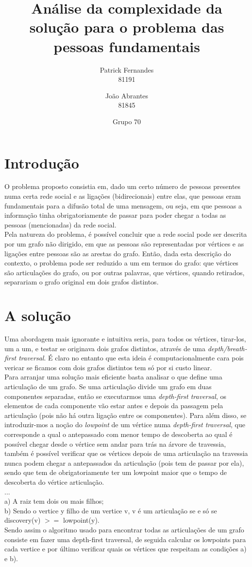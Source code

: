 \documentclass[12pt]{article}
\title{Análise da complexidade da solução para o problema das pessoas fundamentais}
\author{Patrick Fernandes\\81191 \and João Abrantes\\81845}
\date{Grupo 70}
\begin{document}
\maketitle
\section{Introdução}
O problema proposto consistia em, dado um certo número de pessoas presentes numa certa rede social e as ligações (bidirecionais) entre elas, que pessoas eram fundamentais para a difusão total de uma mensagem, ou seja, em que pessoas a informação tinha obrigatoriamente de passar para poder chegar a todas as pessoas (mencionadas) da rede social.\\
Pela natureza do problema, é possível concluir que a rede social pode ser descrita por um grafo não dirigido, em que as pessoas são representadas por vértices e as ligações entre pessoas são as arestas do grafo. Então, dada esta descrição do contexto, o problema pode ser reduzido a um em termos do grafo: que vértices são articulações do grafo, ou por outras palavras, que vértices, quando retirados, separariam o grafo original em dois grafos distintos.
\section{A solução}
Uma abordagem mais ignorante e intuitiva seria, para todos os vértices, tirar-los, um a um, e testar se originava dois grafos distintos, através de uma \textit{depth/breath-first traversal}. É claro no entanto que esta ideia é computacionalmente cara pois vericar se ficamos com dois grafos distintos tem só por si custo linear. \\ 
Para arranjar uma solução mais eficiente basta analisar o que define uma articulação de um grafo. Se uma articulação divide um grafo em duas componentes separadas, então se executarmos uma \textit{depth-first traversal}, os elementos de cada componente vão estar antes e depois da passagem pela articulação (pois não há outra ligação entre os componentes). Para além disso, se introduzir-mos a noção do \textit{lowpoint} de um vértice numa \textit{depth-first traversal}, que corresponde a qual o antepassado com menor tempo de descoberta ao qual é possível chegar desde o vértice sem andar para trás na árvore de travessia, também é possível verificar que os vértices depois de uma articulação na travessia nunca podem chegar a antepassados da articulação (pois tem de passar por ela), sendo que tem de obrigatoriamente ter um lowpoint maior que o tempo de descoberta do vértice articulação.\\
...\\
a) A raiz tem dois ou mais filhos;\\
b) Sendo o vertice y filho de um vertice v, v é um articulação se e só se discovery(v) $>=$ lowpoint(y).\\
Sendo assim o algoritmo usado para encontrar todas as articulações de um grafo consiste em fazer uma depth-first traversal, de seguida calcular os lowpoints para cada vertice e por último verificar quais os vértices que respeitam as condições a) e b).\\
\end{document}
